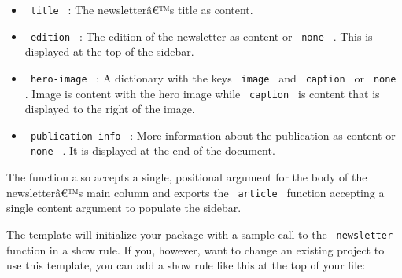 \begin{itemize}
\tightlist
\item
  \texttt{\ title\ } : The newsletterâ€™s title as content.
\item
  \texttt{\ edition\ } : The edition of the newsletter as content or
  \texttt{\ none\ } . This is displayed at the top of the sidebar.
\item
  \texttt{\ hero-image\ } : A dictionary with the keys
  \texttt{\ image\ } and \texttt{\ caption\ } or \texttt{\ none\ } .
  Image is content with the hero image while \texttt{\ caption\ } is
  content that is displayed to the right of the image.
\item
  \texttt{\ publication-info\ } : More information about the publication
  as content or \texttt{\ none\ } . It is displayed at the end of the
  document.
\end{itemize}

The function also accepts a single, positional argument for the body of
the newsletterâ€™s main column and exports the \texttt{\ article\ }
function accepting a single content argument to populate the sidebar.

The template will initialize your package with a sample call to the
\texttt{\ newsletter\ } function in a show rule. If you, however, want
to change an existing project to use this template, you can add a show
rule like this at the top of your file:

\begin{Shaded}
\begin{Highlighting}[]
\NormalTok{  edition: [}
\NormalTok{  ],}
\NormalTok{  ),}
\NormalTok{  publication{-}info: [}
\NormalTok{  ],}
\NormalTok{)}

\end{Highlighting}
\end{Shaded}

